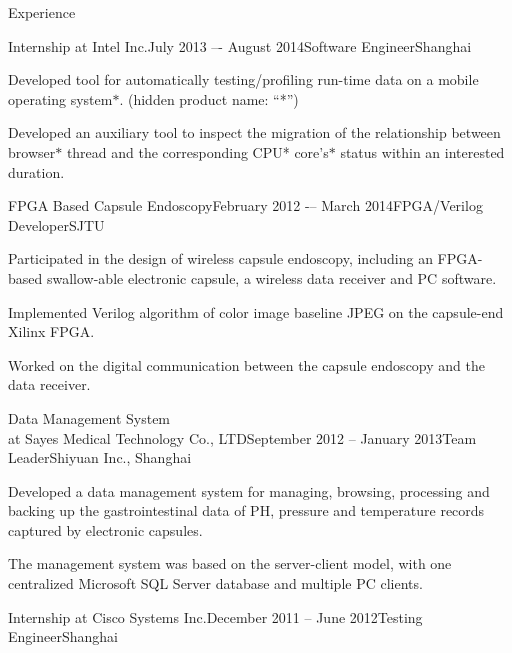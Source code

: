 \documentclass{resume} %
\begin{document}
\begin{rSection}{Experience}
\begin{rSubsection}{Internship at Intel Inc.}{July 2013 –- August 2014}{Software Engineer}{Shanghai}
    \item Developed tool for automatically testing/profiling run-time data on a
        mobile operating system$*$. (hidden product name: ``*'')

    \item Developed an auxiliary tool to inspect the migration of the
        relationship between browser$*$ thread and the corresponding CPU*
        core's$*$ status within an interested duration.

    \end{rSubsection}

    \begin{rSubsection}{FPGA Based Capsule Endoscopy}{February 2012 -– March 2014}{FPGA/Verilog Developer}{SJTU}

    \item Participated in the design of wireless capsule endoscopy, including an
        FPGA-based swallow-able electronic capsule, a wireless data receiver and PC
        software.

    \item Implemented Verilog algorithm of color image baseline JPEG on the
        capsule-end Xilinx FPGA.

    \item Worked on the digital communication between the capsule endoscopy and
        the data receiver.

    \end{rSubsection}

    \begin{rSubsection}{Data Management System\\ at Sayes Medical Technology Co., LTD}{September 2012 -- January 2013}{Team Leader}{Shiyuan Inc., Shanghai}

    \item Developed a data management system for managing, browsing, processing
        and backing up the gastrointestinal data of PH, pressure and
        temperature records captured by electronic capsules.

    \item The management system was based on the server-client model, with one
        centralized Microsoft SQL Server database and multiple PC clients.

    \end{rSubsection}

    \begin{rSubsection}{Internship at Cisco Systems Inc.}{December 2011 -- June 2012}{Testing Engineer}{Shanghai}


\end{rSubsection}
\end{rSection}
\end{document}
